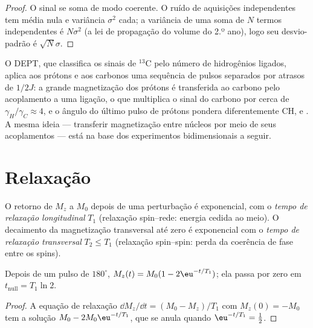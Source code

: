 \begin{proof}
O sinal se soma de modo coerente. O ruído de aquisições independentes tem
média nula e variância $\sigma^2$ cada; a variância de uma soma de $N$ termos
independentes é $N\sigma^2$ (a lei de propagação do volume do 2.º ano), logo seu
desvio-padrão é $\sqrt N\sigma$.
\end{proof}

O DEPT, que classifica os sinais de ${}^{13}$C pelo número de hidrogênios
ligados, aplica aos prótons e aos carbonos uma sequência de pulsos separados
por atrasos de $1/2J$: a grande magnetização dos prótons é transferida ao
carbono pelo acoplamento a uma ligação, o que multiplica o sinal do carbono por
cerca de $\gamma_H/\gamma_C \approx 4$, e o ângulo do último pulso de prótons pondera
diferentemente CH,  e . A mesma ideia --- transferir magnetização
entre núcleos por meio de seus acoplamentos --- está na base dos experimentos
bidimensionais a seguir.

\section{Relaxação}

\begin{definition}\label{def:b3:advanced-nmr:relaxation}
O retorno de $M_z$ a $M_0$ depois de uma perturbação é exponencial, com o
\emph{tempo de relaxação longitudinal} $T_1$
(relaxação spin--rede: energia cedida ao meio). O decaimento da magnetização
transversal até zero é exponencial com o \emph{tempo de relaxação
transversal} $T_2 \le T_1$
(relaxação spin--spin: perda da coerência de fase entre os spins).
\end{definition}

\begin{proposition}\label{prop:b3:advanced-nmr:inversion-recovery}
Depois de um pulso de $180^\circ$, $M_z(t) = M_0(1 - 2\eu^{-t/T_1})$; ela passa por zero em
$t_{\mathrm{null}} = T_1\ln2$.
\end{proposition}

\begin{proof}
A equação de relaxação $\dd M_z/\dd t = (M_0 - M_z)/T_1$ com $M_z(0) = -M_0$ tem a
solução $M_0 - 2M_0\eu^{-t/T_1}$, que se anula quando $\eu^{-t/T_1} = \frac12$.
\end{proof}


